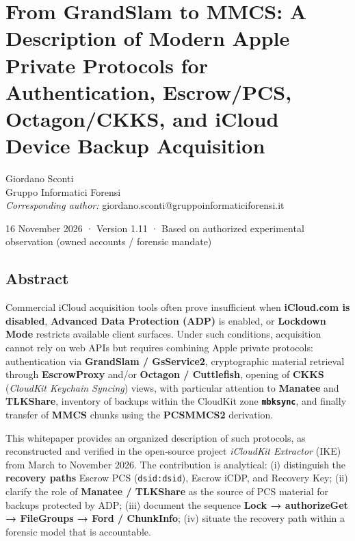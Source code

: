 \documentclass[
  english,
  10pt]{article}
\author{}
\date{}
\begin{document}
\section{From GrandSlam to MMCS: A Description of Modern Apple Private
Protocols for Authentication, Escrow/PCS, Octagon/CKKS, and iCloud
Device Backup
Acquisition}\label{from-grandslam-to-mmcs-a-description-of-modern-apple-private-protocols-for-authentication-escrowpcs-octagonckks-and-icloud-device-backup-acquisition}

Giordano Sconti\\
Gruppo Informatici Forensi\\
\emph{Corresponding author:} giordano.sconti@gruppoinformaticiforensi.it

16 November 2026 · Version 1.11 · Based on authorized experimental
observation (owned accounts / forensic mandate)

\subsection{Abstract}\label{abstract}

Commercial iCloud acquisition tools often prove insufficient when
\textbf{iCloud.com is disabled}, \textbf{Advanced Data Protection (ADP)}
is enabled, or \textbf{Lockdown Mode} restricts available client
surfaces. Under such conditions, acquisition cannot rely on web APIs but
requires combining Apple private protocols: authentication via
\textbf{GrandSlam / GsService2}, cryptographic material retrieval
through \textbf{EscrowProxy} and/or \textbf{Octagon / Cuttlefish},
opening of \textbf{CKKS} (\emph{CloudKit Keychain Syncing}) views, with
particular attention to \textbf{Manatee} and \textbf{TLKShare},
inventory of backups within the CloudKit zone \textbf{\texttt{mbksync}},
and finally transfer of \textbf{MMCS} chunks using the \textbf{PCSMMCS2}
derivation.

This whitepaper provides an organized description of such protocols, as
reconstructed and verified in the open-source project \emph{iCloudKit
Extractor} (IKE) from March to November 2026. The contribution is
analytical: (i) distinguish the \textbf{recovery paths} Escrow PCS
(\texttt{dsid:dsid}), Escrow iCDP, and Recovery Key; (ii) clarify the
role of \textbf{Manatee / TLKShare} as the source of PCS material for
backups protected by ADP; (iii) document the sequence \textbf{Lock →
authorizeGet → FileGroups → Ford / ChunkInfo}; (iv) situate the recovery
path within a forensic model that is accountable.
\end{document}
